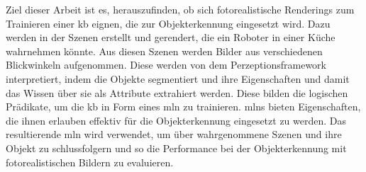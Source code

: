 Ziel dieser Arbeit ist es, herauszufinden, ob sich fotorealistische Renderings zum Trainieren einer \gls{kb} eignen, die zur Objekterkennung eingesetzt wird. Dazu werden in der \unreal Szenen erstellt und gerendert, die ein Roboter in einer Küche wahrnehmen könnte. Aus diesen Szenen werden Bilder aus verschiedenen Blickwinkeln aufgenommen. Diese werden von dem Perzeptionsframework \robosherlock interpretiert, indem die Objekte segmentiert und ihre Eigenschaften und damit das Wissen über sie als Attribute extrahiert werden. Diese bilden die logischen Prädikate, um die \gls{kb} in Form eines \gls{mln} zu trainieren. \glspl{mln} bieten Eigenschaften, die ihnen erlauben effektiv für die Objekterkennung eingesetzt zu werden. Das resultierende \gls{mln} wird verwendet, um über wahrgenommene Szenen und ihre Objekt zu schlussfolgern und so die Performance bei der Objekterkennung mit fotorealistischen Bildern zu evaluieren.       